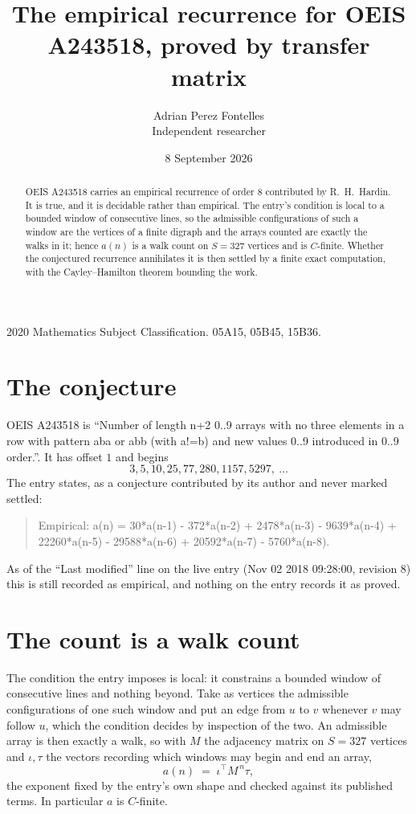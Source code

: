 \documentclass[11pt,a4paper]{article}
\title{The empirical recurrence for OEIS A243518, proved by transfer matrix}
\author{Adrian Perez Fontelles\\ \small Independent researcher}
\date{8 September 2026}
\theoremstyle{plain}
\theoremstyle{definition}
\begin{document}
\maketitle

\begin{abstract}
OEIS A243518 carries an empirical recurrence of order $8$ contributed by R.~H.~Hardin. It is
true, and it is decidable rather than empirical. The entry's condition is local to a bounded window of consecutive lines, so
the admissible configurations of such a window are the vertices of a finite digraph and the
arrays counted are exactly the walks in it; hence $a(n)$ is a walk count on $S=327$ vertices
and is $C$-finite. Whether the conjectured recurrence annihilates it is then settled by a
finite exact computation, with the Cayley--Hamilton theorem bounding the work.
\end{abstract}

\noindent\small 2020 Mathematics Subject Classification. 05A15, 05B45, 15B36.\normalsize

\section{The conjecture}

OEIS A243518 is ``Number of length n+2 0..9 arrays with no three elements in a row with pattern aba or abb (with a!=b) and new values 0..9 introduced in 0..9 order.''. It has offset $1$ and begins
\[
3, 5, 10, 25, 77, 280, 1157, 5297,\ \dots
\]
The entry states, as a conjecture contributed by its author and never marked settled:
\begin{quote}
Empirical: a(n) = 30*a(n-1) - 372*a(n-2) + 2478*a(n-3) - 9639*a(n-4) + 22260*a(n-5) - 29588*a(n-6) + 20592*a(n-7) - 5760*a(n-8).
\end{quote}
As of the ``Last modified'' line on the live entry (Nov 02 2018 09:28:00, revision 8) this is still
recorded as empirical, and nothing on the entry records it as proved.

\section{The count is a walk count}

The condition the entry imposes is local: it constrains a bounded window of consecutive lines and nothing beyond. Take as
vertices the admissible configurations of one such window and put an edge from $u$ to $v$
whenever $v$ may follow $u$, which the condition decides by inspection of the two. An
admissible array is then exactly a walk, so with $M$ the adjacency matrix on $S=327$ vertices
and $\iota,\tau$ the vectors recording which windows may begin and end an array,
\[
a(n)\;=\;\iota^{\!\top}M^{\,n}\tau ,
\]
the exponent fixed by the entry's own shape and checked against its published terms. In
particular $a$ is $C$-finite.
\end{document}
